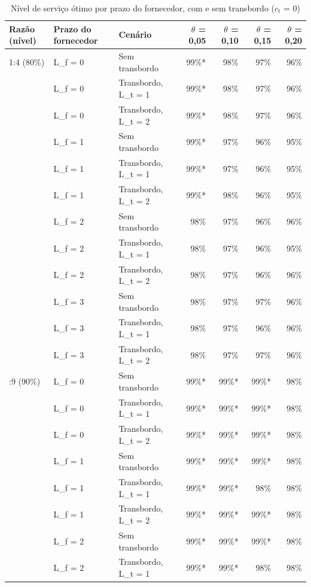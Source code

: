\begin{table}[htbp]
\centering
\small
\caption{Nível de serviço ótimo por prazo do fornecedor, com e sem transbordo ($c_t$ = 0)}
\label{tab:tbr_nivel_otimo}
\begin{tabular}{lllrrrr}
\toprule
Razão (nível) & Prazo do fornecedor & Cenário & $\theta$ = 0,05 & $\theta$ = 0,10 & $\theta$ = 0,15 & $\theta$ = 0,20 \\
\midrule
1:4 (80\%) & L\_f = 0 & Sem transbordo & 99\%* & 98\% & 97\% & 96\% \\
 & L\_f = 0 & Transbordo, L\_t = 1 & 99\%* & 98\% & 97\% & 96\% \\
 & L\_f = 0 & Transbordo, L\_t = 2 & 99\%* & 98\% & 97\% & 96\% \\
 & L\_f = 1 & Sem transbordo & 99\%* & 97\% & 96\% & 95\% \\
 & L\_f = 1 & Transbordo, L\_t = 1 & 99\%* & 97\% & 96\% & 95\% \\
 & L\_f = 1 & Transbordo, L\_t = 2 & 99\%* & 98\% & 96\% & 95\% \\
 & L\_f = 2 & Sem transbordo & 98\% & 97\% & 96\% & 96\% \\
 & L\_f = 2 & Transbordo, L\_t = 1 & 98\% & 97\% & 96\% & 95\% \\
 & L\_f = 2 & Transbordo, L\_t = 2 & 98\% & 97\% & 96\% & 96\% \\
 & L\_f = 3 & Sem transbordo & 98\% & 97\% & 97\% & 96\% \\
 & L\_f = 3 & Transbordo, L\_t = 1 & 98\% & 97\% & 96\% & 96\% \\
 & L\_f = 3 & Transbordo, L\_t = 2 & 98\% & 97\% & 97\% & 96\% \\
\addlinespace
1:9 (90\%) & L\_f = 0 & Sem transbordo & 99\%* & 99\%* & 99\%* & 98\% \\
 & L\_f = 0 & Transbordo, L\_t = 1 & 99\%* & 99\%* & 99\%* & 98\% \\
 & L\_f = 0 & Transbordo, L\_t = 2 & 99\%* & 99\%* & 99\%* & 98\% \\
 & L\_f = 1 & Sem transbordo & 99\%* & 99\%* & 99\%* & 98\% \\
 & L\_f = 1 & Transbordo, L\_t = 1 & 99\%* & 99\%* & 98\% & 98\% \\
 & L\_f = 1 & Transbordo, L\_t = 2 & 99\%* & 99\%* & 99\%* & 98\% \\
 & L\_f = 2 & Sem transbordo & 99\%* & 99\%* & 99\%* & 98\% \\
 & L\_f = 2 & Transbordo, L\_t = 1 & 99\%* & 99\%* & 98\% & 98\% \\

\end{tabular}
\end{table}
